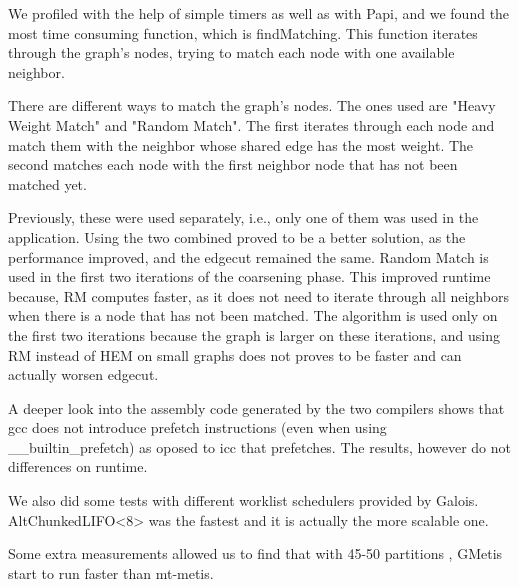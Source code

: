 \documentclass[abstract=on,9pt,twocolumn]{scrartcl}
\begin{document}
We profiled with the help of simple timers as well as with Papi, and we
found the most time consuming function, which is findMatching. This
function iterates through the graph's nodes, trying to match each node
with one available neighbor.


There are different ways to match the graph's nodes. The ones used are
"Heavy Weight Match" and "Random Match". The first iterates through each
node and match them with the neighbor whose shared edge has the most
weight. The second matches each node with the first neighbor node that
has not been matched yet.

Previously, these were used separately, i.e., only one of them was
used in the application. Using the two combined proved to be a better
solution, as the performance improved, and the edgecut remained the
same. Random Match is used in the first two iterations of the coarsening
phase. This improved runtime because, RM computes faster, as it does not
need to iterate through all neighbors when there is a node that has not
been matched. The algorithm is used only on the first two iterations
because the graph is larger on these iterations, and using RM instead of
HEM on small graphs does not proves to be faster and can actually worsen
edgecut.

A deeper look into the assembly code generated by the two compilers
shows that gcc does not introduce prefetch instructions (even when using
\_\_builtin\_prefetch) as oposed to icc that prefetches. The results,
however do not differences on runtime.

We also did some tests with different worklist schedulers provided by
Galois. AltChunkedLIFO<8> was the fastest and it is actually the more
scalable one.




Some extra measurements allowed us to find that with 45-50 partitions
, GMetis start to run faster than mt-metis.

\end{document}
